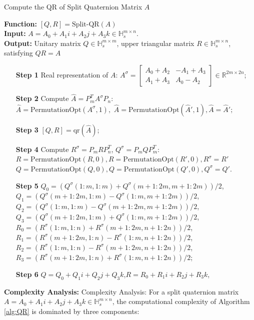 \documentclass[5p,10pt]{elsarticle}
\numberwithin{equation}{section}
\begin{document}
\linespread{1.1}
\begin{algorithm}[htbp] 
        \caption{Compute the QR of Split Quaternion Matrix \(A\)}
        \label{alg:QR}
        \textbf{Function:} $[Q, R]=\text{Split-QR}(A)$\\
        \textbf{Input:} \(A = A_0 + A_1 i + A_2 j + A_3 k \in \mathbb{H}_s^{m\times n}\). \\
        {\textbf{Output:}  }  Unitary matrix \(Q \in \mathbb{H}_s^{m\times m}\), upper triangular matrix \(R \in \mathbb{H}_s^{m\times n}\), satisfying \(Q  R = A\) 
    \begin{itemize}
        \item[\textbf{Step 1}] Real representation of $A$: \(A^\sigma = \begin{bmatrix}
            A_0 + A_2 & -A_1 + A_3 \\ 
            A_1 + A_3 & A_0 - A_2
            \end{bmatrix} \in \mathbb{R}^{2m\times 2n}\);
         \item[\textbf{Step 2}] Compute \(\hat{A} = P_{m}^T A^\sigma P_{n}\): \\$\hat{A}=\text{PermutationOpt}(A^\sigma,1),$ $\hat{A}=\text{PermutationOpt}(\hat{A}',1),\hat{A}=\hat{A}';$
        \item[\textbf{Step 3}] \([Q,R] = \text{qr}(\hat{A})\);
        \item[\textbf{Step 4}] Compute \(R^\sigma = P_{m}RP_{n}^T\), \(Q^\sigma = P_{m}QP_{m}^T\):\\
        $R=\text{PermutationOpt}(R,0),R=\text{PermutationOpt}(R',0),R^\sigma=R'$\\
        $Q=\text{PermutationOpt}(Q,0),Q=\text{PermutationOpt}(Q',0),Q^\sigma=Q'.$
        \item[\textbf{Step 5}] \(Q_0 = (Q^\sigma(1:m,1:m) + Q^\sigma(m+1:2m,m+1:2m))/2\),
           \(Q_1 = (Q^\sigma(m+1:2m,1:m) - Q^\sigma(1:m,m+1:2m))/2\),
            \(Q_2 = (Q^\sigma(1:m,1:m) - Q^\sigma(m+1:2m,m+1:2m))/2\),
            \(Q_3 = (Q^\sigma(m+1:2m,1:m) + Q^\sigma(1:m,m+1:2m))/2\),
            \(R_0 = (R^\sigma(1:m,1:n) + R^\sigma(m+1:2m,n+1:2n))/2\),
            \(R_1 = (R^\sigma(m+1:2m,1:n) - R^\sigma(1:m,n+1:2n))/2\),
            \(R_2 = (R^\sigma(1:m,1:n) - R^\sigma(m+1:2m,n+1:2n))/2\),
            \(R_3 = (R^\sigma(m+1:2m,1:n) + R^\sigma(1:m,n+1:2n))/2\);
        \item[\textbf{Step 6}] \(Q = Q_0 + Q_1i + Q_2j + Q_3k\),\quad\(R = R_0 + R_1i + R_2j + R_3k\),
        \end{itemize}
\end{algorithm}
\textbf{Complexity Analysis:}
{Complexity Analysis:} For a split quaternion matrix $A = A_0 + A_1i + A_2j + A_3k \in \mathbb{H}_s^{m \times n}$, the computational complexity of Algorithm \ref{alg:QR} is dominated by three components:  
\end{document}
